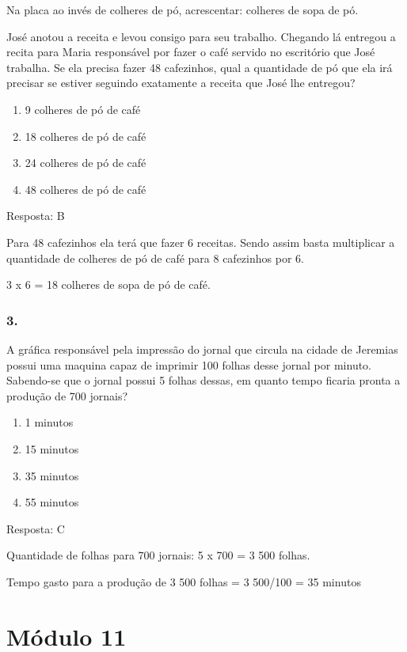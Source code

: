 Na placa ao invés de colheres de pó, acrescentar: colheres de sopa de
pó.

José anotou a receita e levou consigo para seu trabalho. Chegando lá
entregou a recita para Maria responsável por fazer o café servido no
escritório que José trabalha. Se ela precisa fazer 48 cafezinhos, qual a
quantidade de pó que ela irá precisar se estiver seguindo exatamente a
receita que José lhe entregou?

\begin{enumerate}
\def\labelenumi{\alph{enumi})}
\item
  9 colheres de pó de café
\item
  18 colheres de pó de café
\item
  24 colheres de pó de café
\item
  48 colheres de pó de café
\end{enumerate}

Resposta: B

Para 48 cafezinhos ela terá que fazer 6 receitas. Sendo assim basta
multiplicar a quantidade de colheres de pó de café para 8 cafezinhos por
6.

3 x 6 = 18 colheres de sopa de pó de café.

\subsubsection{3.}\label{section-129}

A gráfica responsável pela impressão do jornal que circula na cidade de
Jeremias possui uma maquina capaz de imprimir 100 folhas desse jornal
por minuto. Sabendo-se que o jornal possui 5 folhas dessas, em quanto
tempo ficaria pronta a produção de 700 jornais?

\begin{enumerate}
\def\labelenumi{\alph{enumi})}
\item
  1 minutos
\item
  15 minutos
\item
  35 minutos
\item
  55 minutos
\end{enumerate}

Resposta: C

Quantidade de folhas para 700 jornais: 5 x 700 = 3 500 folhas.

Tempo gasto para a produção de 3 500 folhas = 3 500/100 = 35 minutos

\section{Módulo 11}\label{muxf3dulo-11}

